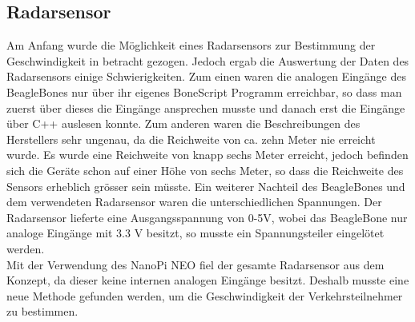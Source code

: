 \subsection{Radarsensor}
Am Anfang wurde die Möglichkeit eines Radarsensors zur Bestimmung der Geschwindigkeit in betracht gezogen. Jedoch ergab die Auswertung der Daten des Radarsensors einige Schwierigkeiten. Zum einen waren die analogen Eingänge des BeagleBones nur über ihr eigenes BoneScript Programm erreichbar, so dass man zuerst über dieses die Eingänge ansprechen musste und danach erst die Eingänge über C++ auslesen konnte. Zum anderen waren die Beschreibungen des Herstellers sehr ungenau, da die Reichweite von ca. zehn Meter nie erreicht wurde. Es wurde eine Reichweite von knapp sechs Meter erreicht, jedoch befinden sich die Geräte schon auf einer Höhe von sechs Meter, so dass die Reichweite des Sensors erheblich grösser sein müsste. Ein weiterer Nachteil des BeagleBones und dem verwendeten Radarsensor waren die unterschiedlichen Spannungen. Der Radarsensor lieferte eine Ausgangsspannung von 0-5V, wobei das BeagleBone nur analoge Eingänge mit 3.3 V besitzt, so musste ein Spannungsteiler eingelötet werden. \\
Mit der Verwendung des NanoPi NEO fiel der gesamte Radarsensor aus dem Konzept, da dieser keine internen analogen Eingänge besitzt. Deshalb musste eine neue Methode gefunden werden, um die Geschwindigkeit der Verkehrsteilnehmer zu bestimmen.
